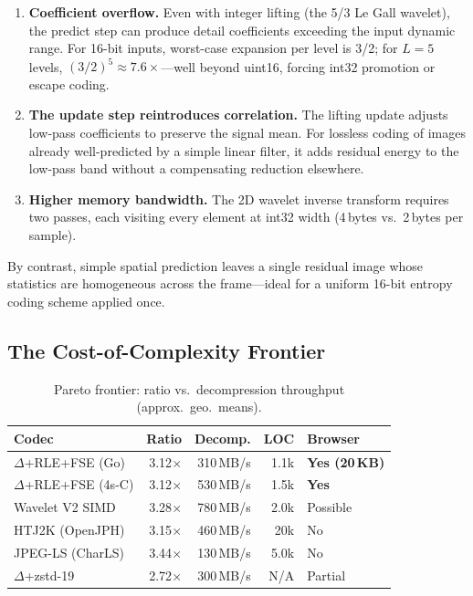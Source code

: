 \documentclass[journal]{IEEEtran}
\begin{document}
\begin{enumerate}
  \item \textbf{Coefficient overflow.} Even with integer lifting (the 5/3 Le
  Gall wavelet), the predict step can produce detail coefficients exceeding the
  input dynamic range. For 16-bit inputs, worst-case expansion per level is 3/2;
  for $L=5$ levels, $(3/2)^5 \approx 7.6\times$---well beyond uint16, forcing
  int32 promotion or escape coding.

  \item \textbf{The update step reintroduces correlation.} The lifting update
  adjusts low-pass coefficients to preserve the signal mean. For lossless coding
  of images already well-predicted by a simple linear filter, it adds residual
  energy to the low-pass band without a compensating reduction elsewhere.

  \item \textbf{Higher memory bandwidth.} The 2D wavelet inverse transform
  requires two passes, each visiting every element at int32 width (4\,bytes vs.\
  2\,bytes per sample).
\end{enumerate}

By contrast, simple spatial prediction leaves a single residual image whose
statistics are homogeneous across the frame---ideal for a uniform 16-bit entropy
coding scheme applied once.

\subsection{The Cost-of-Complexity Frontier}

\begin{table}[htbp]
\centering
\caption{Pareto frontier: ratio vs.\ decompression throughput (approx.\ geo.\ means).}
\label{tab:pareto}
\begin{tabular}{lrrrp{1.5cm}}
\toprule
Codec & Ratio & Decomp. & LOC & Browser \\
\midrule
$\Delta$+RLE+FSE (Go)   & 3.12$\times$ & 310\,MB/s & 1.1k & \textbf{Yes (20\,KB)} \\
$\Delta$+RLE+FSE (4s-C) & 3.12$\times$ & 530\,MB/s & 1.5k & \textbf{Yes} \\
Wavelet V2 SIMD         & 3.28$\times$ & 780\,MB/s & 2.0k & Possible \\
HTJ2K (OpenJPH)         & 3.15$\times$ & 460\,MB/s & 20k  & No \\
JPEG-LS (CharLS)        & 3.44$\times$ & 130\,MB/s & 5.0k & No \\
$\Delta$+zstd-19        & 2.72$\times$ & 300\,MB/s & N/A  & Partial \\
\bottomrule
\end{tabular}
\end{table}
\end{document}
